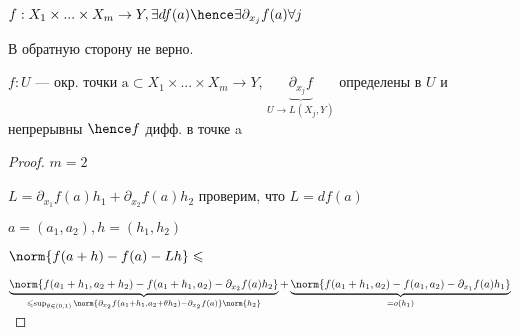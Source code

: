 \begin{remark}
    $f : X_1 \times ... \times X_m \to Y, \exists df(a) \hence \exists \partial_{x_j} f(a) \forall j$

    В обратную сторону не верно.
\end{remark}

\begin{theorem}
    $f : U \text{ --- окр. точки a}\subset X_1 \times ... \times X_m \to Y$, $\underbrace{\partial_{x_j}f}_{U \to L(X_j, Y)}$ определены в $U$ и непрерывны $\hence f $ дифф. в точке a
\end{theorem}


\begin{proof}
    $m = 2$

    $L = \partial_{x_1} f(a) h_1 + \partial_{x_2} f(a) h_2$ проверим, что $L = df(a)$





    $a = (a_1, a_2), h=(h_1, h_2)$

    $\norm{f(a + h) - f(a) - Lh} \leqslant$ 
    
    $\underbrace{\norm{f(a_1 + h_1, a_2 + h_2) - f(a_1 + h_1, a_2) - \partial_{x _ 2}f(a)h_2}}_{\leqslant \sup_{\theta \in (0, 1)} \norm{\partial_{x_2} f(a_1 + h_1, a_2 + \theta h_2) - \partial_{x_2}f(a)} \norm{h_2}} + \underbrace{\norm{f(a_1 + h_1, a_2) - f(a_1, a_2) - \partial_{x_1} f(a) h_1}}_{= o(h_1)}$
\end{proof}

\quad

